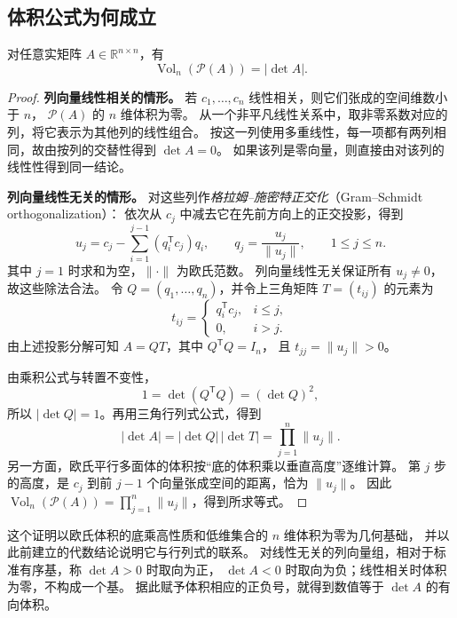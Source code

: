 \documentclass[UTF8,12pt,a4paper,fontset=fandol]{ctexart}
\begin{document}
\subsection{体积公式为何成立}

\begin{theorem}[平行多面体的体积]
\label{thm:volume}
对任意实矩阵 $A\in\mathbb R^{n\times n}$，有
\begin{equation}
  \operatorname{Vol}_n(\mathcal P(A))=|\det A|.
  \label{eq:volume}
\end{equation}
\end{theorem}

\begin{proof}
\textbf{列向量线性相关的情形。}
若 $c_1,\ldots,c_n$ 线性相关，则它们张成的空间维数小于 $n$，
$\mathcal P(A)$ 的 $n$ 维体积为零。
从一个非平凡线性关系中，取非零系数对应的列，将它表示为其他列的线性组合。
按这一列使用多重线性，每一项都有两列相同，故由按列的交替性得到 $\det A=0$。
如果该列是零向量，则直接由对该列的线性性得到同一结论。

\textbf{列向量线性无关的情形。}
对这些列作\emph{格拉姆--施密特正交化}（Gram--Schmidt orthogonalization）：
依次从 $c_j$ 中减去它在先前方向上的正交投影，得到
\[
  u_j=c_j-\sum_{i=1}^{j-1}(q_i^{\mathsf T}c_j)q_i,
  \qquad
  q_j=\frac{u_j}{\|u_j\|},\qquad 1\leq j\leq n.
\]
其中 $j=1$ 时求和为空，$\|\cdot\|$ 为欧氏范数。
列向量线性无关保证所有 $u_j\ne0$，故这些除法合法。
令 $Q=(q_1,\ldots,q_n)$，并令上三角矩阵 $T=(t_{ij})$ 的元素为
\[
  t_{ij}=\begin{cases}
    q_i^{\mathsf T}c_j,&i\leq j,\\
    0,&i>j.
  \end{cases}
\]
由上述投影分解可知 $A=QT$，其中 $Q^{\mathsf T}Q=I_n$，
且 $t_{jj}=\|u_j\|>0$。

由乘积公式与转置不变性，
\[
  1=\det(Q^{\mathsf T}Q)=(\det Q)^2,
\]
所以 $|\det Q|=1$。再用三角行列式公式，得到
\[
  |\det A|=|\det Q|\,|\det T|=\prod_{j=1}^{n}\|u_j\|.
\]
另一方面，欧氏平行多面体的体积按“底的体积乘以垂直高度”逐维计算。
第 $j$ 步的高度，是 $c_j$ 到前 $j-1$ 个向量张成空间的距离，恰为 $\|u_j\|$。
因此 $\operatorname{Vol}_n(\mathcal P(A))=\prod_{j=1}^{n}\|u_j\|$，得到所求等式。
\end{proof}

这个证明以欧氏体积的底乘高性质和低维集合的 $n$ 维体积为零为几何基础，
并以此前建立的代数结论说明它与行列式的联系。
对线性无关的列向量组，相对于标准有序基，称 $\det A>0$ 时取向为正，
$\det A<0$ 时取向为负；线性相关时体积为零，不构成一个基。
据此赋予体积相应的正负号，就得到数值等于 $\det A$ 的有向体积。
\end{document}
